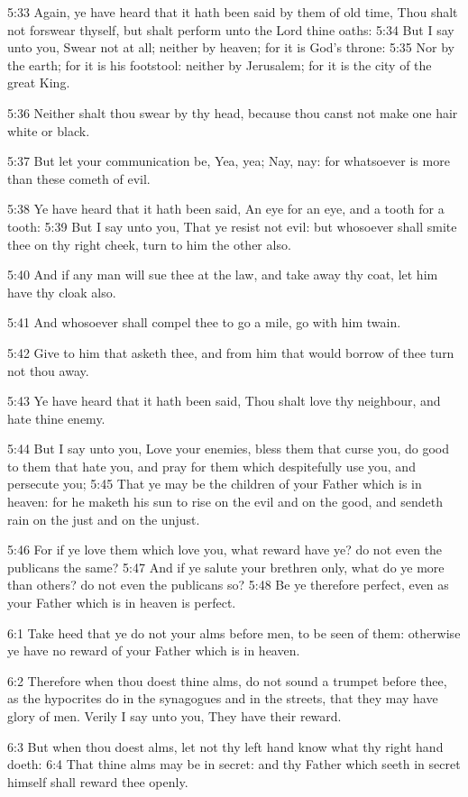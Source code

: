 5:33 Again, ye have heard that it hath been said by them of old time,
Thou shalt not forswear thyself, but shalt perform unto the Lord thine
oaths: 5:34 But I say unto you, Swear not at all; neither by heaven;
for it is God's throne: 5:35 Nor by the earth; for it is his
footstool: neither by Jerusalem; for it is the city of the great King.

5:36 Neither shalt thou swear by thy head, because thou canst not make
one hair white or black.

5:37 But let your communication be, Yea, yea; Nay, nay: for whatsoever
is more than these cometh of evil.

5:38 Ye have heard that it hath been said, An eye for an eye, and a
tooth for a tooth: 5:39 But I say unto you, That ye resist not evil:
but whosoever shall smite thee on thy right cheek, turn to him the
other also.

5:40 And if any man will sue thee at the law, and take away thy coat,
let him have thy cloak also.

5:41 And whosoever shall compel thee to go a mile, go with him twain.

5:42 Give to him that asketh thee, and from him that would borrow of
thee turn not thou away.

5:43 Ye have heard that it hath been said, Thou shalt love thy
neighbour, and hate thine enemy.

5:44 But I say unto you, Love your enemies, bless them that curse you,
do good to them that hate you, and pray for them which despitefully
use you, and persecute you; 5:45 That ye may be the children of your
Father which is in heaven: for he maketh his sun to rise on the evil
and on the good, and sendeth rain on the just and on the unjust.

5:46 For if ye love them which love you, what reward have ye? do not
even the publicans the same?  5:47 And if ye salute your brethren
only, what do ye more than others? do not even the publicans so?  5:48
Be ye therefore perfect, even as your Father which is in heaven is
perfect.

6:1 Take heed that ye do not your alms before men, to be seen of them:
otherwise ye have no reward of your Father which is in heaven.

6:2 Therefore when thou doest thine alms, do not sound a trumpet
before thee, as the hypocrites do in the synagogues and in the
streets, that they may have glory of men. Verily I say unto you, They
have their reward.

6:3 But when thou doest alms, let not thy left hand know what thy
right hand doeth: 6:4 That thine alms may be in secret: and thy Father
which seeth in secret himself shall reward thee openly.

